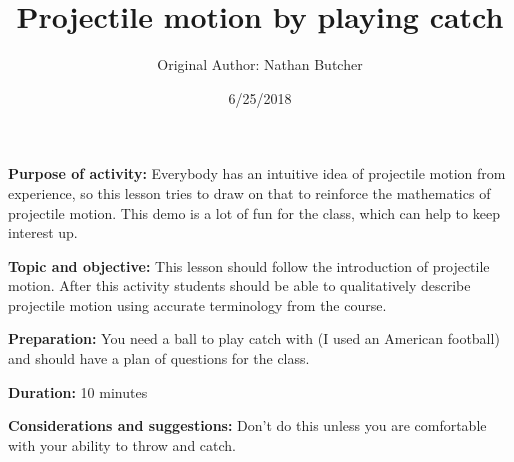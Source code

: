 \documentclass{article}
\title{Projectile motion by playing catch}
\author{Original Author: Nathan Butcher}
\date{6/25/2018}
\begin{document}
\maketitle
\thispagestyle{empty}

\textbf{Purpose of activity:}  Everybody has an intuitive idea of projectile motion from experience, so this lesson tries to draw on that to reinforce the mathematics of projectile motion. This demo is a lot of fun for the class, which can help to keep interest up.

\textbf{Topic and objective:} This lesson should follow the introduction of projectile motion. After this activity students should be able to qualitatively describe projectile motion using accurate terminology from the course. 

\textbf{Preparation:} You need a ball to play catch with (I used an American football) and should have a plan of questions for the class. 

\textbf{Duration:} 10 minutes 

\textbf{Considerations and suggestions:} Don't do this unless you are comfortable with your ability to throw and catch.

\hspace{14pt}
\end{document}

